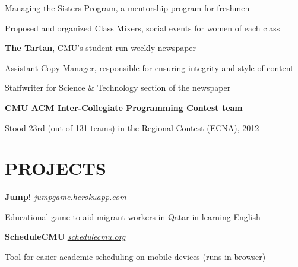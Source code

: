 \documentclass[margin, 11pt]{res} %
\begin{document}
\begin{resume}
\begin{itemize} \itemsep -2pt
{\small \item Managing the Sisters Program, a mentorship program for freshmen
\item Proposed and organized Class Mixers, social events for women of each class}
\end{itemize}

\vspace{3pt}

{\bf The Tartan}, CMU's student-run weekly newspaper

\begin{itemize} \itemsep -2pt
{\small \item Assistant Copy Manager, responsible for ensuring integrity and style of content
\item Staffwriter for Science \& Technology section of the newspaper}
\end{itemize} 

\vspace{3pt}

{\bf CMU ACM Inter-Collegiate Programming Contest team}
\begin{itemize} \itemsep -2pt
{\small \item Stood 23rd (out of 131 teams) in the Regional Contest (ECNA), 2012}
\end{itemize}

\section{PROJECTS} 

{\bf Jump!} \href{http://jumpgame.herokuapp.com/}{\sl jumpgame.herokuapp.com}

\begin{itemize} \itemsep -2pt
{\small \item Educational game to aid migrant workers in Qatar in learning English}
\end{itemize}

\vspace{3pt}

{\bf ScheduleCMU} \href{www.schedulecmu.org}{\sl schedulecmu.org}

\begin{itemize} \itemsep -2pt
{\small \item Tool for easier academic scheduling on mobile devices (runs in browser)}
\end{itemize}


\end{resume}
\end{document}

